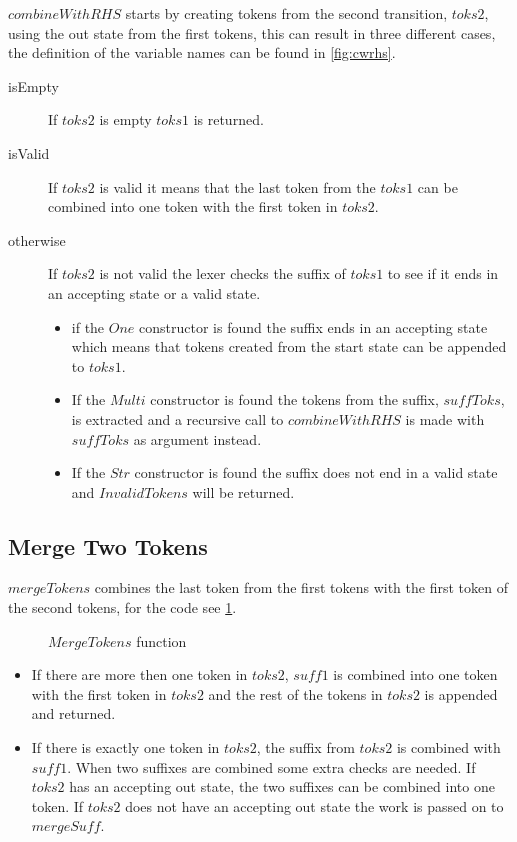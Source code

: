 $combineWithRHS$ starts by creating tokens from the second transition, $toks2$,
using the out state from the first tokens, this can result in three different
cases, the definition of the variable names can be found in \cref{fig:cwrhs}.
\begin{description}
\item[isEmpty]If $toks2$ is empty $toks1$ is returned.
\item[isValid]If $toks2$ is valid it means that the last token from the
  $toks1$ can be combined into one token with the first token in $toks2$.
\item[otherwise]If $toks2$ is not valid the lexer checks the suffix of $toks1$
  to see if it ends in an accepting state or a valid state.
  \begin{itemize}
  \item if the $One$ constructor is found the suffix ends in an accepting state
    which means that tokens created from the start state can be appended to
    $toks1$.
  \item If the $Multi$ constructor is found the tokens from the suffix,
    $suffToks$, is extracted and a recursive call to $combineWithRHS$ is made
    with $suffToks$ as argument instead.
  \item If the $Str$ constructor is found the suffix does not end in a valid
    state and $InvalidTokens$ will be returned.
  \end{itemize}
\end{description}

\subsection{Merge Two Tokens}
$mergeTokens$ combines the last token from the first tokens with
the first token of the second tokens, for the code see \cref{fig:mergetokens}.

\begin{figure}[h!]
  
  \caption{$MergeTokens$ function \label{fig:mergetokens}}
\end{figure}
\begin{itemize}
\item If there are more then one token in $toks2$, $suff1$ is combined into one
  token with the first token in $toks2$ and the rest of the tokens in $toks2$
  is appended and returned.
\item If there is exactly one token in $toks2$, the suffix from $toks2$ is
  combined with $suff1$. When two suffixes are combined some extra checks are
  needed. If $toks2$ has an accepting out state, the two suffixes
  can be combined into one token. If $toks2$ does not have an accepting out
  state the work is passed on to $mergeSuff$.
\end{itemize}

